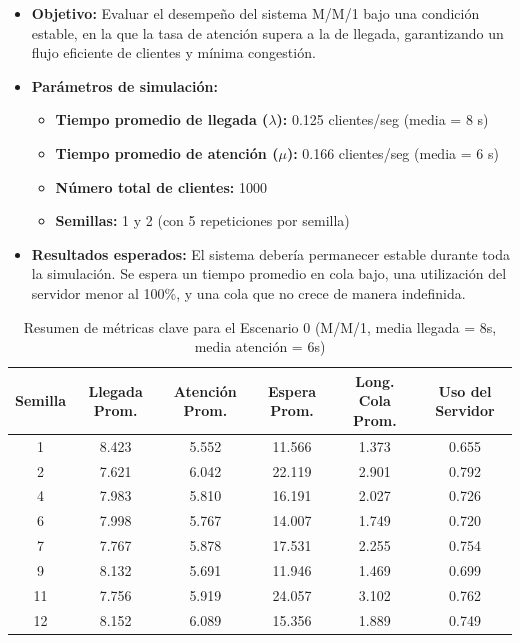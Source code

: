 \documentclass{article}
\begin{document}
\begin{itemize}
    \item \textbf{Objetivo:} Evaluar el desempeño del sistema M/M/1 bajo una condición estable, en la que la tasa de atención supera a la de llegada, garantizando un flujo eficiente de clientes y mínima congestión.

    \item \textbf{Parámetros de simulación:}
    \begin{itemize}
        \item \textbf{Tiempo promedio de llegada ($\lambda$):} 0.125 clientes/seg (media = 8 s)
        \item \textbf{Tiempo promedio de atención ($\mu$):} 0.166 clientes/seg (media = 6 s)
        \item \textbf{Número total de clientes:} 1000
        \item \textbf{Semillas:} 1 y 2 (con 5 repeticiones por semilla)
    \end{itemize}

    \item \textbf{Resultados esperados:} 
    El sistema debería permanecer estable durante toda la simulación. Se espera un tiempo promedio en cola bajo, una utilización del servidor menor al 100\%, y una cola que no crece de manera indefinida.


\end{itemize}
\begin{table}[H]
\centering
\caption{Resumen de métricas clave para el Escenario 0 (M/M/1, media llegada = 8s, media atención = 6s)}
\label{tab:escenario0}
\begin{tabular}{|c|c|c|c|c|c|}
\hline
\textbf{Semilla} & \textbf{Llegada Prom.} & \textbf{Atención Prom.} & \textbf{Espera Prom.} & \textbf{Long. Cola Prom.} & \textbf{Uso del Servidor} \\
\hline
1  & 8.423 & 5.552 & 11.566 & 1.373 & 0.655 \\
2  & 7.621 & 6.042 & 22.119 & 2.901 & 0.792 \\
4  & 7.983 & 5.810 & 16.191 & 2.027 & 0.726 \\
6  & 7.998 & 5.767 & 14.007 & 1.749 & 0.720 \\
7  & 7.767 & 5.878 & 17.531 & 2.255 & 0.754 \\
9  & 8.132 & 5.691 & 11.946 & 1.469 & 0.699 \\
11 & 7.756 & 5.919 & 24.057 & 3.102 & 0.762 \\
12 & 8.152 & 6.089 & 15.356 & 1.889 & 0.749 \\
\hline
\end{tabular}
\end{table}
\end{document}
